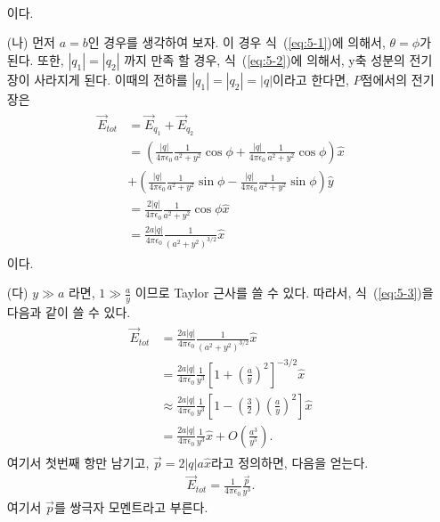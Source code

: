 \documentclass[tightenlines,floatfix,nofootinbib,superscriptaddress,fleqn]{revtex4-2}
\begin{document}
\begin{itemize}
\begin{align}
  \end{align}
  이다.
\item[(나)] 
먼저 $a=b$인 경우를 생각하여 보자. 이 경우 식~(\ref{eq:5-1})에 의해서,
$\theta=\phi$가 된다. 또한, $\left|q_1\right|=\left|q_2\right|$ 까지 만족 할 경우,
식~(\ref{eq:5-2})에 의해서, y축 성분의 전기장이 사라지게 된다. 이때의 전하를
$\left|q_1\right|=\left|q_2\right|=\left|q\right|$이라고 한다면, 
$P$점에서의 전기장은
\begin{align}\label{eq:5-3}
  \begin{split}
    \vec{E}_{tot}&=\vec{E}_{q_1}+\vec{E}_{q_2}\\
    &=\left(\frac{\left|q\right|}{4\pi\epsilon_0}\frac{1}{a^2+y^2}\cos{\phi}+\frac{\left|q\right|}{4\pi\epsilon_0}\frac{1}{a^2+y^2}\cos{\phi}\right)\hat{x}\\
    &+\left(\frac{\left|q\right|}{4\pi\epsilon_0}\frac{1}{a^2+y^2}\sin{\phi}-\frac{\left|q\right|}{4\pi\epsilon_0}\frac{1}{a^2+y^2}\sin{\phi}\right)\hat{y}\\
    &=\frac{2\left|q\right|}{4\pi\epsilon_0}\frac{1}{a^2+y^2}\cos{\phi}\hat{x}\\
    &=\frac{2a\left|q\right|}{4\pi\epsilon_0}\frac{1}{\left(a^2+y^2\right)^{3/2}}\hat{x}
  \end{split}
\end{align}
이다.
\item[(다)]
	$y \gg a$ 라면, $1 \gg \frac{a}{y}$ 이므로 Taylor 근사를 쓸 수 있다.
  따라서, 식~(\ref{eq:5-3})을 다음과 같이 쓸 수 있다.
  \begin{align}
    \begin{split}
      \vec{E}_{tot}&=\frac{2a\left|q\right|}{4\pi\epsilon_0}\frac{1}{\left(a^2+y^2\right)^{3/2}}\hat{x}\\
      &=\frac{2a\left|q\right|}{4\pi\epsilon_0}\frac{1}{y^3}\left[1+\left(\frac{a}{y}\right)^2\right]^{-3/2}\hat{x}\\
      &\approx\frac{2a\left|q\right|}{4\pi\epsilon_0}\frac{1}{y^3}\left[1-\left(\frac{3}{2}\right)\left(\frac{a}{y}\right)^2\right]\hat{x}\\
      &=\frac{2a\left|q\right|}{4\pi\epsilon_0}\frac{1}{y^3}\hat{x}+O\left(\frac{a^3}{y^5}\right).
    \end{split}
  \end{align}
	여기서 첫번째 항만 남기고, $\vec{p}=2\left|q\right|a\hat{x}$라고
  정의하면, 다음을 얻는다.
  \begin{align}
    \vec{E}_{tot}=\frac{1}{4\pi\epsilon_0}\frac{\vec{p}}{y^3}.
  \end{align}
  여기서 $\vec{p}$를 쌍극자 모멘트라고 부른다.
	\end{itemize}
	
\end{document}
